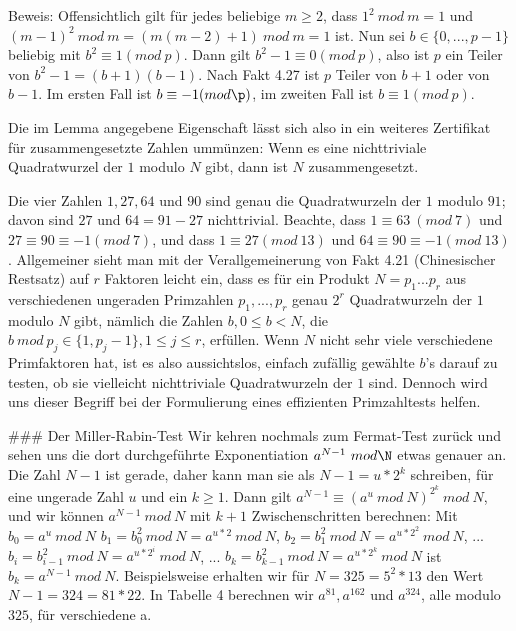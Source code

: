 \documentclass[a4paper]{article}
\begin{document}
\begin{multicols}{3}
Beweis: Offensichtlich gilt für jedes beliebige $m\geq 2$, dass $1^2\ mod\ m= 1$ und $(m-1)^2\ mod\ m= (m(m-2)+1)\ mod\ m= 1$ ist. Nun sei $b\in\{0 ,...,p-1\}$ beliebig mit $b^2\equiv 1(mod\ p)$. Dann gilt $b^2-1 \equiv 0 (mod\ p)$, also ist $p$ ein Teiler von $b^2-1 =(b+1)(b-1)$. Nach Fakt 4.27 ist $p$ Teiler von $b+1$ oder von $b-1$. Im ersten Fall ist $b\equiv -1 (mod\p)$, im zweiten Fall ist $b\equiv 1(mod\ p)$. 

Die im Lemma angegebene Eigenschaft lässt sich also in ein weiteres Zertifikat für zusammengesetzte Zahlen ummünzen:
  Wenn es eine nichttriviale Quadratwurzel der $1$ modulo $N$ gibt, dann ist $N$ zusammengesetzt.

Die vier Zahlen $1, 27, 64$ und $90$ sind genau die Quadratwurzeln der $1$ modulo $91$; davon sind $27$ und $64 = 91-27$ nichttrivial. Beachte, dass $1\equiv 63\ (mod\ 7)$ und $27\equiv 90 \equiv -1(mod\ 7)$, und dass $1\equiv 27 (mod\ 13)$ und $64\equiv 90 \equiv -1 (mod\ 13)$. Allgemeiner sieht man mit der Verallgemeinerung von Fakt 4.21 (Chinesischer Restsatz) auf $r$ Faktoren leicht ein, dass es für ein Produkt $N=p_1...p_r$ aus verschiedenen ungeraden Primzahlen $p_1,...,p_r$ genau $2^r$ Quadratwurzeln der $1$ modulo $N$ gibt, nämlich die Zahlen $b,0\leq b < N$, die $b\ mod\ p_j\in\{1 ,p_j-1\}, 1\leq j\leq r$, erfüllen. Wenn $N$ nicht sehr viele verschiedene Primfaktoren hat, ist es also aussichtslos, einfach zufällig gewählte $b$’s darauf zu testen, ob sie vielleicht nichttriviale Quadratwurzeln der $1$ sind. Dennoch wird uns dieser Begriff bei der Formulierung eines effizienten Primzahltests helfen.

### Der Miller-Rabin-Test
Wir kehren nochmals zum Fermat-Test zurück und sehen uns die dort durchgeführte Exponentiation $a^{N-1}\ mod\N$ etwas genauer an. Die Zahl $N-1$ ist gerade, daher kann man sie als $N-1=u*2^k$ schreiben, für eine ungerade Zahl $u$ und ein $k\geq 1$. Dann gilt $a^{N-1} \equiv (a^u\ mod\ N)^{2^k}\ mod\ N$, und wir können $a^{N-1}\ mod\ N$ mit $k+1$ Zwischenschritten berechnen: Mit
  $b_0 =a^u\ mod\ N$
  $b_1 =b^2_0\ mod\ N=a^{u*2}\ mod\ N$,
  $b_2 =b^2_1\ mod\ N=a^{u*2^2}\ mod\ N$,
  ...
  $b_i=b^2_{i-1}\ mod\ N=a^{u*2^i}\ mod\ N$,
  ...
  $b_k=b^2_{k-1}\ mod\ N=a^{u*2^k}\ mod\ N$
ist $b_k=a^{N-1}\ mod\ N$. Beispielsweise erhalten wir für $N=325 = 5^2 *13$ den Wert $N-1 = 324 = 81* 22$. In Tabelle 4 berechnen wir $a^{81} ,a^{162}$ und $a^{324}$, alle modulo $325$, für verschiedene a.


\end{multicols}
\end{document}
